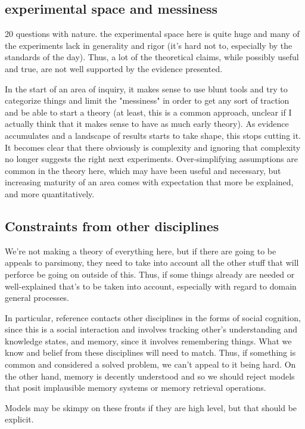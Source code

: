 \documentclass[]{article}
\begin{document}
\subsection{experimental space and messiness}
20 	questions with nature. 
the experimental space here is quite huge and many of the experiments lack in generality and rigor (it's hard not to, especially by the standards of the day). Thus, a lot of the theoretical claims, while possibly useful and true, are not well supported by the evidence presented. 

In the start of an area of inquiry, it makes sense to use blunt tools and try to categorize things and limit the "messiness" in order to get any sort of traction and be able to start a theory (at least, this is a common approach, unclear if I actually think that it makes sense to have as much early theory). As evidence accumulates and a landscape of results starts to take shape, this stops cutting it. It becomes clear that there obviously is complexity and ignoring that complexity no longer suggests the right next experiments. Over-simplifying assumptions are common in the theory here, which may have been useful and necessary, but increasing maturity of an area comes with expectation that more be explained, and more quantitatively. 
\subsection{Constraints from other disciplines}
We're not making a theory of everything here, but if there are going to be appeals to parsimony, they need to take into account all the other stuff that will perforce be going on outside of this. Thus, if some things already are needed or well-explained that's to be  taken into account, especially with regard to domain general processes. 

In particular, reference contacts other disciplines in the forms of social cognition, since this is a social interaction and involves tracking other's understanding and knowledge states, and memory, since it involves remembering things. What we know and belief from these disciplines will need to match. Thus, if something is common and considered a solved problem, we can't appeal to it being hard. On the other hand, memory is decently understood and so we should reject models that posit implausible memory systems or memory retrieval operations. 

Models may be skimpy on these fronts if they are high level, but that should be explicit. 
\end{document}
